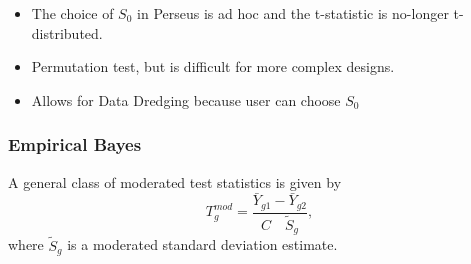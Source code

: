 \documentclass[
]{article}
\newenvironment{Shaded}{\begin{snugshade}}{\end{snugshade}}
\newcommand{\AttributeTok}[1]{\textcolor[rgb]{0.77,0.63,0.00}{#1}}
\newcommand{\DecValTok}[1]{\textcolor[rgb]{0.00,0.00,0.81}{#1}}
\newcommand{\FloatTok}[1]{\textcolor[rgb]{0.00,0.00,0.81}{#1}}
\newcommand{\FunctionTok}[1]{\textcolor[rgb]{0.00,0.00,0.00}{#1}}
\newcommand{\NormalTok}[1]{#1}
\newcommand{\OtherTok}[1]{\textcolor[rgb]{0.56,0.35,0.01}{#1}}
\newcommand{\SpecialCharTok}[1]{\textcolor[rgb]{0.00,0.00,0.00}{#1}}
\newcommand{\StringTok}[1]{\textcolor[rgb]{0.31,0.60,0.02}{#1}}
\providecommand{\tightlist}{%
  \setlength{\itemsep}{0pt}\setlength{\parskip}{0pt}}
\begin{document}
\begin{Shaded}
\end{Shaded}

\begin{itemize}
\tightlist
\item
  The choice of \(S_0\) in Perseus is ad hoc and the t-statistic is
  no-longer t-distributed.
\item
  Permutation test, but is difficult for more complex designs.
\item
  Allows for Data Dredging because user can choose \(S_0\)
\end{itemize}

\hypertarget{empirical-bayes}{%
\subsubsection{Empirical Bayes}\label{empirical-bayes}}

A general class of moderated test statistics is given by \[
   T_g^{mod} = \frac{\bar{Y}_{g1} - \bar{Y}_{g2}}{C \quad \tilde{S}_g} ,
 \] where \(\tilde{S}_g\) is a moderated standard deviation estimate.
\end{document}
